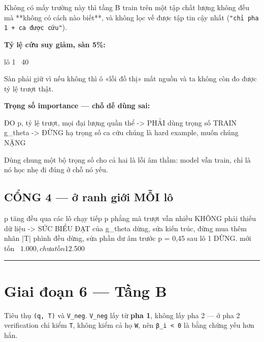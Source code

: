 \documentclass[11pt,a4paper]{article}
\begin{document}
Không có mấy trường này thì tầng B train trên một tập chất lượng không đều mà **không có cách
nào biết**, và không lọc về được tập tin cậy nhất (\texttt{"chỉ pha 1 + ca được cứu"}).

\textbf{Tỷ lệ cứu suy giảm, sàn 5\%:}

\begin{dia}
lô 1   ~40%
\end{dia}

Sàn phải giữ vì nếu không thì ô «lỗi đồ thị» mất nguồn và ta không còn đo được tỷ lệ trượt
thật.

\textbf{Trọng số importance — chỗ dễ dùng sai:}

\begin{dia}
ĐO     p, tỷ lệ trượt, mọi đại lượng quần thể   ->  PHẢI dùng trọng số
TRAIN  g_theta                                      ->  ĐỪNG hạ trọng số ca cứu
                                                    chúng là hard example, muốn chúng NẶNG
\end{dia}

Dùng chung một bộ trọng số cho cả hai là lỗi âm thầm: model vẫn train, chỉ là nó học nhẹ đi
đúng ở chỗ nó yếu.

\subsection{CỔNG 4 — ở ranh giới MỖI lô}

\begin{dia}
p tăng đều qua các lô           chạy tiếp
p phẳng mà trượt vẫn nhiều      KHÔNG phải thiếu dữ liệu -> SỨC BIỂU ĐẠT của g_theta
                                dừng, sửa kiến trúc, đừng mua thêm nhãn
|T| phình đều                   dừng, sửa phần dư âm trước
p = 0,45 sau lô 1               DỪNG.  mới tốn ~$1.000, chưa tốn $12.500
\end{dia}

\vspace{0.3em}\hrule\vspace{0.6em}

\section{Giai đoạn 6 — Tầng B}

Tiêu thụ \texttt{(q, T)} và \texttt{V\_neg}. \texttt{V\_neg} lấy từ \textbf{pha 1}, không lấy pha 2 — ở pha 2
verification chỉ kiểm \texttt{T}, không kiểm cả họ \texttt{W}, nên \texttt{β\_i < 0} là bằng chứng yếu hơn hẳn.
\end{document}
